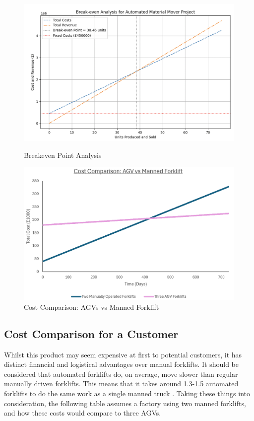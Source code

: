 \documentclass[12pt]{article}
\begin{document}
\begin{figure}[ht]
    \centering
    \begin{minipage}{0.45\linewidth}
        \centering
        \includegraphics[width=\linewidth]{breakeven.png} %
        \caption{Breakeven Point Analysis}
        \label{fig:breakeven}
    \end{minipage}
    \hspace{0.05\linewidth}
    \begin{minipage}{0.45\linewidth}
        \centering
        \includegraphics[width=\linewidth]{CostComparison1.png}
        \caption{Cost Comparison: AGVs vs Manned Forklift}
        \label{fig:timeline}
    \end{minipage}
\end{figure}


\FloatBarrier
\subsection{Cost Comparison for a Customer}
Whilst this product may seem expensive at first to potential customers, it has distinct financial and logistical advantages over manual forklifts. 
It should be considered that automated forklifts do, on average, move slower than regular manually driven forklifts. This means that it takes around 1.3-1.5 automated forklifts to do the same work as a single manned truck \cite{Pastor-Tella2024}. 
Taking these things into consideration, the following table assumes a factory using two manned forklifts, and how these costs would compare to three AGVs.
 
\end{document}

